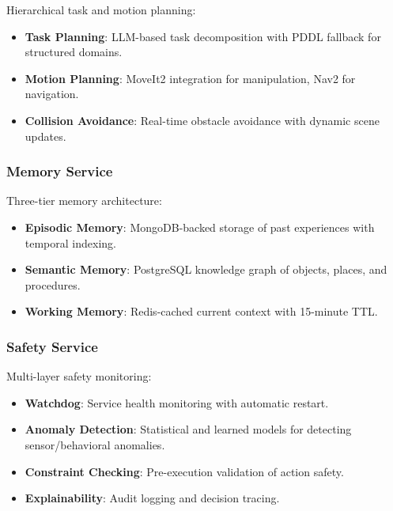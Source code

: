 \documentclass[conference]{IEEEtran}
\begin{document}
Hierarchical task and motion planning:

\begin{itemize}
    \item \textbf{Task Planning}: LLM-based task decomposition with PDDL fallback for structured domains.
    
    \item \textbf{Motion Planning}: MoveIt2 integration for manipulation, Nav2 for navigation.
    
    \item \textbf{Collision Avoidance}: Real-time obstacle avoidance with dynamic scene updates.
\end{itemize}

\subsubsection{Memory Service}

Three-tier memory architecture:

\begin{itemize}
    \item \textbf{Episodic Memory}: MongoDB-backed storage of past experiences with temporal indexing.
    
    \item \textbf{Semantic Memory}: PostgreSQL knowledge graph of objects, places, and procedures.
    
    \item \textbf{Working Memory}: Redis-cached current context with 15-minute TTL.
\end{itemize}

\subsubsection{Safety Service}

Multi-layer safety monitoring:

\begin{itemize}
    \item \textbf{Watchdog}: Service health monitoring with automatic restart.
    
    \item \textbf{Anomaly Detection}: Statistical and learned models for detecting sensor/behavioral anomalies.
    
    \item \textbf{Constraint Checking}: Pre-execution validation of action safety.
    
    \item \textbf{Explainability}: Audit logging and decision tracing.
\end{itemize}
\end{document}
